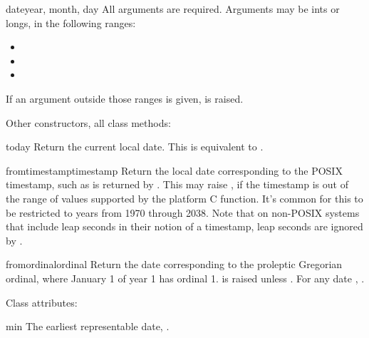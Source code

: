 \begin{classdesc}{date}{year, month, day}
  All arguments are required.  Arguments may be ints or longs, in the
  following ranges:

  \begin{itemize}
    \item {}
    \item {}
    \item {}
  \end{itemize}

  If an argument outside those ranges is given, 
  is raised.
\end{classdesc}

Other constructors, all class methods:

\begin{methoddesc}{today}{}
  Return the current local date.  This is equivalent to
  .
\end{methoddesc}

\begin{methoddesc}{fromtimestamp}{timestamp}
  Return the local date corresponding to the POSIX timestamp, such
  as is returned by .  This may raise
  , if the timestamp is out of the range of
  values supported by the platform C 
  function.  It's common for this to be restricted to years from 1970
  through 2038.  Note that on non-POSIX systems that include leap
  seconds in their notion of a timestamp, leap seconds are ignored by
  .
\end{methoddesc}

\begin{methoddesc}{fromordinal}{ordinal}
  Return the date corresponding to the proleptic Gregorian ordinal,
  where January 1 of year 1 has ordinal 1.   is
  raised unless .
  For any date , .
\end{methoddesc}

Class attributes:

\begin{memberdesc}{min}
  The earliest representable date, .
\end{memberdesc}

